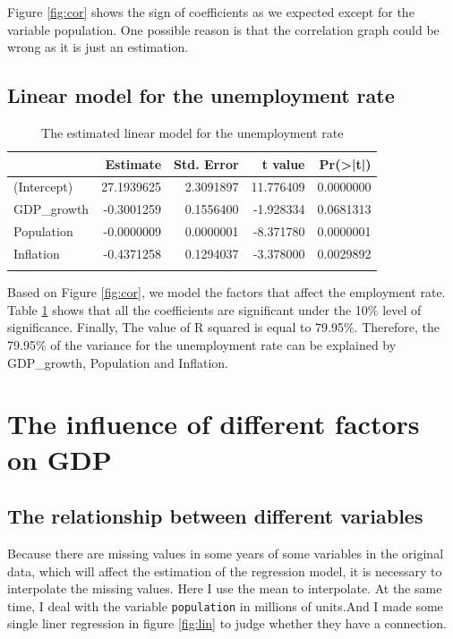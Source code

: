 \documentclass[11pt,a4paper,]{article}
\begin{document}
Figure \ref{fig:cor} shows the sign of coefficients as we expected except for the variable population. One possible reason is that the correlation graph could be wrong as it is just an estimation.

\subsection{Linear model for the unemployment rate}

\begin{table}[H]

\caption{\label{tab:model}The estimated linear model for the unemployment rate}
\centering
\begin{tabular}[t]{lrrrr}
\toprule{}
  & Estimate & Std. Error & t value & Pr(>|t|)\\
\midrule{}
(Intercept) & 27.1939625 & 2.3091897 & 11.776409 & 0.0000000\\
GDP\_growth & -0.3001259 & 0.1556400 & -1.928334 & 0.0681313\\
Population & -0.0000009 & 0.0000001 & -8.371780 & 0.0000001\\
Inflation & -0.4371258 & 0.1294037 & -3.378000 & 0.0029892\\
\bottomrule{}
\end{tabular}
\end{table}

Based on Figure \ref{fig:cor}, we model the factors that affect the employment rate. Table \ref{tab:model} shows that all the coefficients are significant under the 10\% level of significance. Finally, The value of R squared is equal to 79.95\%. Therefore, the 79.95\% of the variance for the unemployment rate can be explained by GDP\_growth, Population and Inflation.

\section{The influence of different factors on GDP}

\subsection{The relationship between  different variables}

Because there are missing values in some years of some variables in the original data, which will affect the estimation of the regression model, it is necessary to interpolate the missing values. Here I use the mean to interpolate. At the same time, I deal with the variable \texttt{population} in millions of units.And I made some single liner regression in figure \ref{fig:lin} to judge whether they have a connection.
\end{document}
